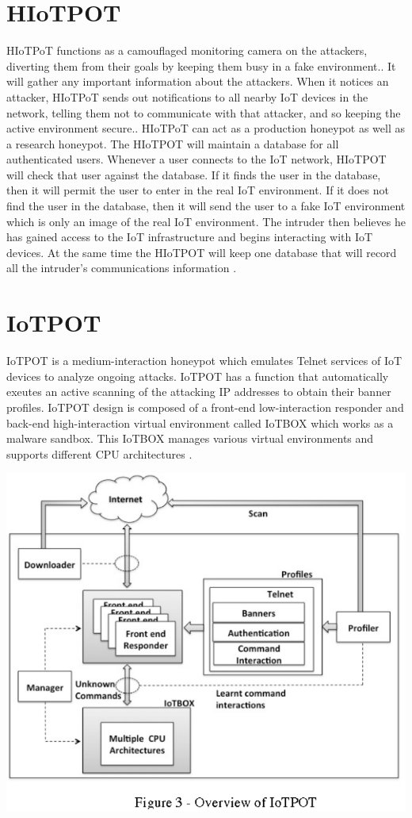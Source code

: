 \documentclass[epsfig,a4paper,11pt,titlepage,oneside,openany]{book}
\begin{document}
\section{HIoTPOT}

HIoTPoT functions as a camouflaged monitoring camera on the attackers, diverting them from their goals by keeping them busy in a fake environment.. It will gather any important information about the attackers. When it notices an attacker, HIoTPoT sends out notifications to all nearby IoT devices in the network, telling them not to communicate with that attacker, and so keeping the active environment secure.. HIoTPoT can act as a production honeypot as well as a research honeypot. The HIoTPOT will maintain a database for all authenticated users. Whenever a user connects to the IoT network, HIoTPOT will check that user against the database. If it finds the user in the database, then it will permit the user to enter in the real IoT environment. If it does not find the user in the database, then it will send the user to a fake IoT environment which is only an image of the real IoT environment. The intruder then believes he has gained access to the IoT infrastructure and begins interacting with IoT devices. At the same time the HIoTPOT will keep one database that will record all the intruder's communications information \cite{gandhi}.

\section{IoTPOT}

IoTPOT is a medium-interaction honeypot which emulates Telnet services of IoT devices to analyze ongoing attacks. IoTPOT has a function that automatically exeutes an active scanning of the attacking IP addresses to obtain their banner profiles. IoTPOT design is composed of a front-end low-interaction responder and back-end high-interaction virtual environment called IoTBOX which works as a malware sandbox. This IoTBOX manages various virtual environments and supports different CPU architectures \cite{IoTPOT}.
\begin{center}
\includegraphics[scale=0.35]{iotpot}
\end{center}
\end{document}
